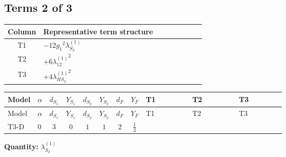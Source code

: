 \documentclass[8pt]{article}
\begin{document}
\begin{landscape}
\subsection*{Terms 2 of 3}
\begin{center}
\begin{tabular}{@{}c >{\raggedright\arraybackslash}p{0.82\linewidth}@{}}
\toprule
Column & Representative term structure \\
\midrule
T1 & \(\displaystyle -12 {g_1}^2 {\lambda_{S_2}^{(1)}}\) \\
\midrule
T2 & \(\displaystyle +6 {\lambda_{12}^{(1)}}^2\) \\
\midrule
T3 & \(\displaystyle +4 {\lambda_{HS_2}^{(1)}}^2\) \\
\midrule
\bottomrule
\end{tabular}
\end{center}
\smallskip
\tiny
\begin{longtable}{@{}llcccccc >{\raggedright\arraybackslash}p{0.21\linewidth} >{\raggedright\arraybackslash}p{0.21\linewidth} >{\raggedright\arraybackslash}p{0.21\linewidth}@{}}
\toprule
Model & $\alpha$ & $d_{S_1}$ & $Y_{S_1}$ & $d_{S_2}$ & $Y_{S_2}$ & $d_F$ & $Y_F$ & T1 & T2 & T3 \\
\midrule
\endfirsthead
\toprule
Model & $\alpha$ & $d_{S_1}$ & $Y_{S_1}$ & $d_{S_2}$ & $Y_{S_2}$ & $d_F$ & $Y_F$ & T1 & T2 & T3 \\
\midrule
\endhead
T3-D & $0$ & $3$ & $0$ & $1$ & $1$ & $2$ & $\frac{1}{2}$ & \scriptsize\adjustbox{max width=\linewidth}{$\begin{gathered} -12 {g_1}^2 {\lambda_{S_2}^{(1)}}\end{gathered}$} & \scriptsize\adjustbox{max width=\linewidth}{$\begin{gathered} +6 {\lambda_{12}^{(1)}}^2\end{gathered}$} & \scriptsize\adjustbox{max width=\linewidth}{$\begin{gathered} +4 {\lambda_{HS_2}^{(1)}}^2\end{gathered}$} \\
\midrule
\bottomrule
\end{longtable}
\clearpage
\noindent\textbf{Quantity: }$\lambda_{S_2}^{(1)}$\par\smallskip

\end{landscape}
\end{document}
